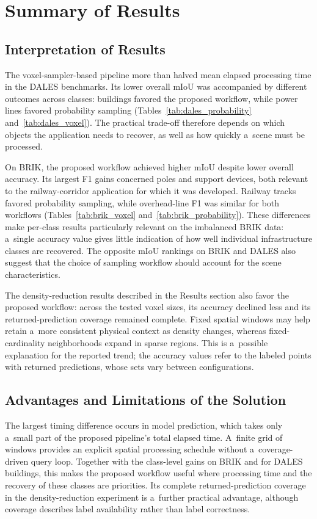 \section{Summary of Results}

\subsection{Interpretation of Results}

The voxel-sampler-based pipeline more than halved mean elapsed processing time in the DALES benchmarks. Its lower overall mIoU was accompanied by different outcomes across classes: buildings favored the proposed workflow, while power lines favored probability sampling (Tables~\ref{tab:dales_probability} and~\ref{tab:dales_voxel}). The practical trade-off therefore depends on which objects the application needs to recover, as well as how quickly a~scene must be processed.

On BRIK, the proposed workflow achieved higher mIoU despite lower overall accuracy. Its largest F1 gains concerned poles and support devices, both relevant to the railway-corridor application for which it was developed. Railway tracks favored probability sampling, while overhead-line F1 was similar for both workflows (Tables~\ref{tab:brik_voxel} and~\ref{tab:brik_probability}). These differences make per-class results particularly relevant on the imbalanced BRIK data: a~single accuracy value gives little indication of how well individual infrastructure classes are recovered. The opposite mIoU rankings on BRIK and DALES also suggest that the choice of sampling workflow should account for the scene characteristics.

The density-reduction results described in the Results section also favor the proposed workflow: across the tested voxel sizes, its accuracy declined less and its returned-prediction coverage remained complete. Fixed spatial windows may help retain a~more consistent physical context as density changes, whereas fixed-cardinality neighborhoods expand in sparse regions. This is a~possible explanation for the reported trend; the accuracy values refer to the labeled points with returned predictions, whose sets vary between configurations.

\subsection{Advantages and Limitations of the Solution}

The largest timing difference occurs in model prediction, which takes only a~small part of the proposed pipeline's total elapsed time. A~finite grid of windows provides an explicit spatial processing schedule without a~coverage-driven query loop. Together with the class-level gains on BRIK and for DALES buildings, this makes the proposed workflow useful where processing time and the recovery of these classes are priorities. Its complete returned-prediction coverage in the density-reduction experiment is a~further practical advantage, although coverage describes label availability rather than label correctness.

